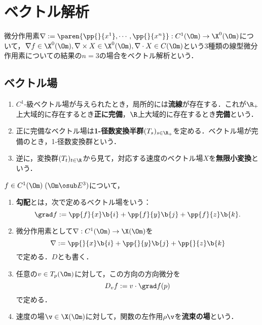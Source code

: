 \documentclass[uplatex,dvipdfmx]{jsreport}
\begin{document}
\section{ベクトル解析}

\begin{tcolorbox}[colframe=ForestGreen, colback=ForestGreen!10!white,breakable,colbacktitle=ForestGreen!40!white,coltitle=black,fonttitle=\bfseries\sffamily,
title=]
    微分作用素$\nabla:=\paren{\pp{}{x^1},\cdots,\pp{}{x^n}}:C^1(\Om)\to\X^0(\Om)$について，$\nabla f\in\X^0(\Om),\nabla\times X\in\X^0(\Om),\nabla\cdot X\in C(\Om)$という3種類の線型微分作用素についての結果の$n=3$の場合をベクトル解析という．
\end{tcolorbox}

\subsection{ベクトル場}

\begin{definition}\mbox{}
    \begin{enumerate}
        \item $C^1$-級ベクトル場が与えられたとき，局所的には\textbf{流線}が存在する．これが$\R_+$上大域的に存在するとき\textbf{正に完備}，$\R$上大域的に存在するとき\textbf{完備}という．
        \item 正に完備なベクトル場は\textbf{1-径数変換半群}$(T_s)_{s\in\R_+}$を定める．ベクトル場が完備のとき，1-径数変換群という．
        \item 逆に，変換群$(T_t)_{t\in\R}$から見て，対応する速度のベクトル場$X$を\textbf{無限小変換}という．
    \end{enumerate}
\end{definition}

\begin{definition}
    $f\in C^1(\Om)\;(\Om\osub E^3)$について，
    \begin{enumerate}
        \item \textbf{勾配}とは，次で定めるベクトル場をいう：
        \[\grad f:=\pp{f}{x}\b{i}+\pp{f}{y}\b{j}+\pp{f}{z}\b{k}.\]
        \item 微分作用素として$\nabla:C^1(\Om)\to\X(\Om)$を
        \[\nabla:=\pp{}{x}\b{i}+\pp{}{y}\b{j}+\pp{}{z}\b{k}\]
        で定める．$D$とも書く．
        \item 任意の$v\in T_p(\Om)$に対して，この方向の方向微分を
        \[D_vf:=v\cdot\grad f(p)\]
        で定める．
        \item 速度の場$\v\in\X(\Om)$に対して，関数の左作用$\rho\v$を\textbf{流束の場}という．
    \end{enumerate}
\end{definition}
\end{document}
